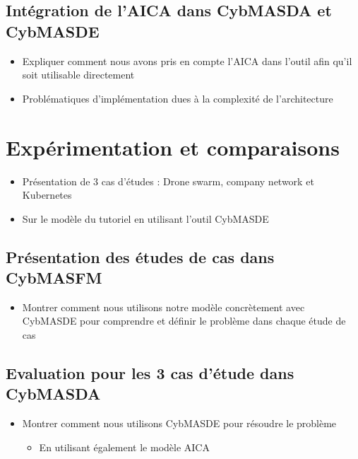 \documentclass[runningheads]{llncs}
\begin{document}
\subsection{Intégration de l'AICA dans CybMASDA et CybMASDE}
\begin{itemize}

    \item Expliquer comment nous avons pris en compte l'AICA dans l'outil afin qu'il soit utilisable directement
    \item Problématiques d'implémentation dues à la complexité de l'architecture
\end{itemize}


\section{Expérimentation et comparaisons}
\begin{itemize}

    \item Présentation de 3 cas d’études : Drone swarm, company network et Kubernetes
    \item Sur le modèle du tutoriel en utilisant l'outil CybMASDE
\end{itemize}
\subsection{Présentation des études de cas dans CybMASFM}
\begin{itemize}

    \item Montrer comment nous utilisons notre modèle concrètement avec CybMASDE pour comprendre et définir le problème dans chaque étude de cas
\end{itemize}

\subsection{Evaluation pour les 3 cas d’étude dans CybMASDA}
\begin{itemize}

    \item Montrer comment nous utilisons CybMASDE pour résoudre le problème
          \begin{itemize}
              \item En utilisant également le modèle AICA
          \end{itemize}
\end{itemize}
\end{document}
